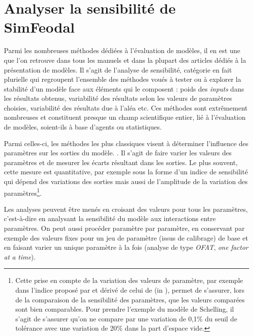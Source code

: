 \clearpage
\section{Analyser la sensibilité de SimFeodal \label{sec:ana-sensib}}

Parmi les nombreuses méthodes dédiées à l'évaluation de modèles, il en est une que l'on retrouve dans tous les manuels et dans la plupart des articles dédiés à la présentation de modèles.
Il s'agit de l'analyse de sensibilité, catégorie en fait plurielle qui regroupent l'ensemble des méthodes voués à tester ou à explorer la stabilité d'un modèle face aux éléments qui le composent : poids des \textit{inputs} dans les résultats obtenus, variabilité des résultats selon les valeurs de paramètres choisies, variabilité des résultats due à l'aléa etc.
Ces méthodes sont extrêmement nombreuses et constituent presque un champ scientifique entier, lié à l'évaluation de modèles, soient-ils à base d'agents ou statistiques.

Parmi celles-ci, les méthodes les plus classiques \autocite[257]{crooks_agent-based_2019} visent à \og déterminer l'influence des paramètres sur les sorties du modèle.\fg{} \autocite[75]{ginot2005explorer}.
Il s'agit de faire varier les valeurs des paramètres et de mesurer les écarts résultant dans les sorties.
Le plus souvent, cette mesure est quantitative, par exemple sous la forme d'un \og indice de sensibilité\fg{} qui dépend des variations des sorties mais aussi de l'amplitude de la variation des paramètres\footnote{
	Cette prise en compte de la variation des valeurs de paramètre, par exemple dans l'indice proposé par \textcite[258]{crooks_agent-based_2019} et dérivé de celui de \textcite{hamby_review_1994} (in \cite[201]{osullivan_spatial_2013}), permet de s'assurer, lors de la comparaison de la sensibilité des paramètres, que les valeurs comparées sont bien comparables.
	Pour prendre l'exemple du modèle de Schelling, il s'agit de s'assurer qu'on ne compare par une variation de 0,1\% du seuil de tolérance avec une variation de 20\% dans la part d'espace vide.
}.

Les analyses peuvent être menés en croisant des valeurs pour tous les paramètres, c'est-à-dire en analysant la sensibilité du modèle aux interactions entre paramètres.
On peut aussi procéder paramètre par paramètre, en conservant par exemple des valeurs fixes pour un jeu de paramètre (issus de calibrage) de base et en faisant varier un unique paramètre à la fois (analyse de type \textit{OFAT}, \og \textit{one factor at a time}\fg{}).


